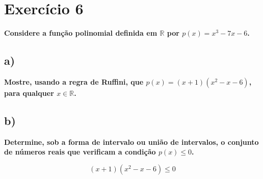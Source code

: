 \documentclass[a4paper]{article}
\begin{document}
	
\section*{Exercício 6}

\textbf{Considere a função polinomial definida em $\mathbb{R}$ por $p(x) = x^3 - 7x - 6$.}

\subsection*{a)}

\textbf{Mostre, usando a regra de Ruffini, que $p(x) = (x + 1)(x^2 - x - 6)$, para qualquer $x \in \mathbb{R}$.}\\




\subsection*{b)}
\textbf{Determine, sob a forma de intervalo ou união de intervalos, o conjunto de números reais que verificam a condição $p(x) \leq 0$.}

\[\textbf{$(x + 1)(x^2 - x - 6) \leq 0$}\]
\end{document}
